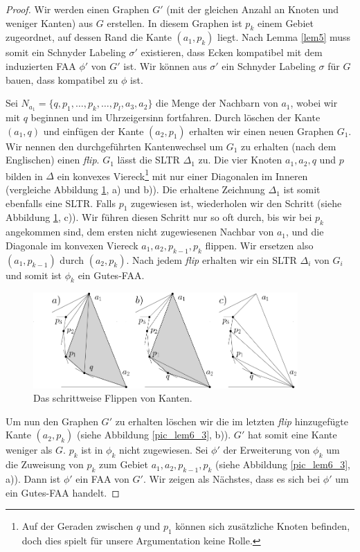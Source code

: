 \begin{proof}
Wir werden einen Graphen $G'$ (mit der gleichen Anzahl an Knoten und weniger Kanten) aus $G$ erstellen. In diesem Graphen ist $p_k$ einem Gebiet zugeordnet, auf dessen Rand die Kante $(a_1,p_k)$ liegt. Nach Lemma \ref{lem5} muss somit ein Schnyder Labeling $\sigma'$ existieren, dass Ecken kompatibel mit dem induzierten FAA $\phi'$ von $G'$ ist. Wir können aus $\sigma'$ ein Schnyder Labeling $\sigma$ für $G$ bauen, dass kompatibel zu $\phi$ ist.

Sei $N_{a_1} = \{q,p_1,\ldots,p_k,\ldots,p_l,a_3,a_2\}$ die Menge der Nachbarn von $a_1$, wobei wir mit $q$ beginnen und im Uhrzeigersinn fortfahren. Durch löschen der Kante $(a_1,q)$ und einfügen der Kante $(a_2,p_1)$ erhalten wir einen neuen Graphen $G_1$. Wir nennen den durchgeführten Kantenwechsel um $G_1$ zu erhalten (nach dem Englischen) einen \textit{flip}. $G_1$ lässt die SLTR $\Delta_1$ zu. Die vier Knoten $a_1,a_2,q$ und $p$ bilden in $\Delta$ ein konvexes Viereck\footnote{Auf der Geraden zwischen $q$ und $p_1$ können sich zusätzliche Knoten befinden, doch dies spielt für unsere Argumentation keine Rolle.} mit nur einer Diagonalen im Inneren (vergleiche Abbildung \ref{pic_lem6_2}, a) und b)). Die erhaltene Zeichnung $\Delta_1$ ist somit ebenfalls eine SLTR. Falls $p_1$ zugewiesen ist, wiederholen wir den Schritt (siehe Abbildung \ref{pic_lem6_2}, c)). Wir führen diesen Schritt nur so oft durch, bis wir bei $p_k$ angekommen sind, dem ersten nicht zugewiesenen Nachbar von $a_1$, und die Diagonale im konvexen Viereck $a_1,a_2,p_{k-1},p_k$ flippen. Wir ersetzen also $(a_1,p_{k-1})$ durch $(a_2,p_{k})$. Nach jedem \textit{flip} erhalten wir ein SLTR $\Delta_i$ von $G_i$ und somit ist $\phi_k$ ein Gutes-FAA.

\begin{figure}
	\centering
	  \includegraphics[width=0.9\textwidth]{lem6_2.png}
    	\caption{Das schrittweise Flippen von Kanten.}
    	\label{pic_lem6_2}
\end{figure}

Um nun den Graphen $G'$ zu erhalten löschen wir die im letzten \textit{flip} hinzugefügte Kante $(a_2,p_{k})$ (siehe Abbildung \ref{pic_lem6_3}, b)). $G'$ hat somit eine Kante weniger als $G$. $p_k$ ist in $\phi_k$ nicht zugewiesen. Sei $\phi'$ der Erweiterung von $\phi_k$ um die Zuweisung von $p_k$ zum Gebiet $a_1,a_2,p_{k-1},p_k$ (siehe Abbildung \ref{pic_lem6_3}, a)). Dann ist $\phi'$ ein FAA von $G'$. Wir zeigen als Nächstes, dass es sich bei $\phi'$ um ein Gutes-FAA handelt.


\end{proof}
